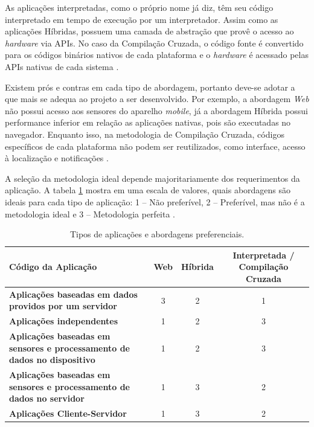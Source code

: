 As aplicações interpretadas, como o próprio nome já diz, têm seu código interpretado em tempo de execução por um interpretador. Assim como as aplicações Híbridas, possuem uma camada de abstração que provê o acesso ao \textit{hardware} via APIs. No caso da Compilação Cruzada, o código fonte é convertido para os códigos binários nativos de cada plataforma e o \textit{hardware} é acessado pelas APIs nativas de cada sistema \cite{raj2012study}.

Existem prós e contras em cada tipo de abordagem, portanto deve-se adotar a que mais se adequa ao projeto a ser desenvolvido. Por exemplo, a abordagem \textit{Web} não possui acesso aos sensores do aparelho \textit{mobile}, já a abordagem Híbrida possui performance inferior em relação as aplicações nativas, pois são executadas no navegador. Enquanto isso, na metodologia de Compilação Cruzada, códigos específicos de cada plataforma não podem ser reutilizados, como interface, acesso à localização e notificações \cite{raj2012study}.

A seleção da metodologia ideal depende majoritariamente dos requerimentos da aplicação. A tabela \ref{tab:crossplatform} mostra em uma escala de valores, quais abordagens são ideais para cada tipo de aplicação: 1 – Não preferível, 2 – Preferível, mas não é a metodologia ideal e 3 – Metodologia perfeita \cite{raj2012study}.

\begin{table}[!htb]
	\centering
	\caption{\label{tab:crossplatform} Tipos de aplicações e abordagens preferenciais.}
	\begin{adjustbox}{max width=\textwidth}
		\begin{tabular}{@{} p{5cm} ccc @{}}
		\toprule
		\textbf{Código da Aplicação} & \textbf{Web} & \textbf{Híbrida} & \textbf{Interpretada / Compilação Cruzada} \\ \hline

		\textbf{Aplicações baseadas em dados providos por um servidor} &
			3 & 2 & 1
		\\ \hline

		\textbf{Aplicações independentes} & 1 & 2 & 3\\ \hline

		\textbf{Aplicações baseadas em sensores e processamento de dados no dispositivo} & 1 & 2 & 3\\ \hline

		\textbf{Aplicações baseadas em sensores e processamento de dados no servidor} & 1 & 3 & 2\\ \hline

		\textbf{Aplicações Cliente-Servidor} & 1 & 3 & 2 \\ \bottomrule
	\end{tabular}
	\end{adjustbox}
\end{table}



